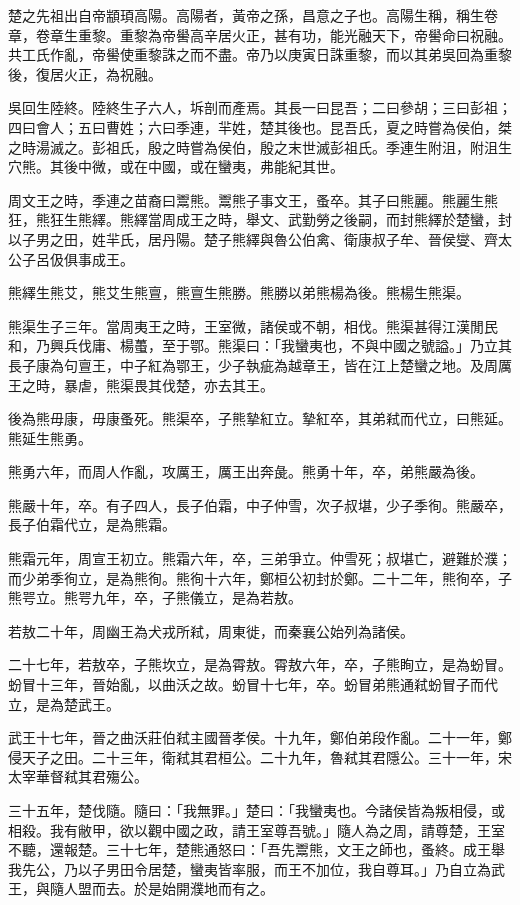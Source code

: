 
\begin{pinyinscope}
楚之先祖出自帝顓頊高陽。高陽者，黃帝之孫，昌意之子也。高陽生稱，稱生卷章，卷章生重黎。重黎為帝嚳高辛居火正，甚有功，能光融天下，帝嚳命曰祝融。共工氏作亂，帝嚳使重黎誅之而不盡。帝乃以庚寅日誅重黎，而以其弟吳回為重黎後，復居火正，為祝融。

吳回生陸終。陸終生子六人，坼剖而產焉。其長一曰昆吾；二曰參胡；三曰彭祖；四曰會人；五曰曹姓；六曰季連，羋姓，楚其後也。昆吾氏，夏之時嘗為侯伯，桀之時湯滅之。彭祖氏，殷之時嘗為侯伯，殷之末世滅彭祖氏。季連生附沮，附沮生穴熊。其後中微，或在中國，或在蠻夷，弗能紀其世。

周文王之時，季連之苗裔曰鬻熊。鬻熊子事文王，蚤卒。其子曰熊麗。熊麗生熊狂，熊狂生熊繹。熊繹當周成王之時，舉文、武勤勞之後嗣，而封熊繹於楚蠻，封以子男之田，姓羋氏，居丹陽。楚子熊繹與魯公伯禽、衛康叔子牟、晉侯燮、齊太公子呂伋俱事成王。

熊繹生熊艾，熊艾生熊亶，熊亶生熊勝。熊勝以弟熊楊為後。熊楊生熊渠。

熊渠生子三年。當周夷王之時，王室微，諸侯或不朝，相伐。熊渠甚得江漢閒民和，乃興兵伐庸、楊蠆，至于鄂。熊渠曰：「我蠻夷也，不與中國之號謚。」乃立其長子康為句亶王，中子紅為鄂王，少子執疵為越章王，皆在江上楚蠻之地。及周厲王之時，暴虐，熊渠畏其伐楚，亦去其王。

後為熊毋康，毋康蚤死。熊渠卒，子熊摯紅立。摯紅卒，其弟弒而代立，曰熊延。熊延生熊勇。

熊勇六年，而周人作亂，攻厲王，厲王出奔彘。熊勇十年，卒，弟熊嚴為後。

熊嚴十年，卒。有子四人，長子伯霜，中子仲雪，次子叔堪，少子季徇。熊嚴卒，長子伯霜代立，是為熊霜。

熊霜元年，周宣王初立。熊霜六年，卒，三弟爭立。仲雪死；叔堪亡，避難於濮；而少弟季徇立，是為熊徇。熊徇十六年，鄭桓公初封於鄭。二十二年，熊徇卒，子熊咢立。熊咢九年，卒，子熊儀立，是為若敖。

若敖二十年，周幽王為犬戎所弒，周東徙，而秦襄公始列為諸侯。

二十七年，若敖卒，子熊坎立，是為霄敖。霄敖六年，卒，子熊眴立，是為蚡冒。蚡冒十三年，晉始亂，以曲沃之故。蚡冒十七年，卒。蚡冒弟熊通弒蚡冒子而代立，是為楚武王。

武王十七年，晉之曲沃莊伯弒主國晉孝侯。十九年，鄭伯弟段作亂。二十一年，鄭侵天子之田。二十三年，衛弒其君桓公。二十九年，魯弒其君隱公。三十一年，宋太宰華督弒其君殤公。

三十五年，楚伐隨。隨曰：「我無罪。」楚曰：「我蠻夷也。今諸侯皆為叛相侵，或相殺。我有敝甲，欲以觀中國之政，請王室尊吾號。」隨人為之周，請尊楚，王室不聽，還報楚。三十七年，楚熊通怒曰：「吾先鬻熊，文王之師也，蚤終。成王舉我先公，乃以子男田令居楚，蠻夷皆率服，而王不加位，我自尊耳。」乃自立為武王，與隨人盟而去。於是始開濮地而有之。


\end{pinyinscope}
